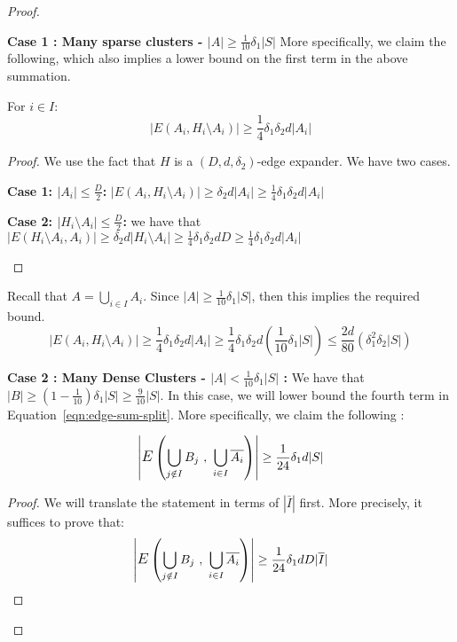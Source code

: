 \begin{proof}
\begin{description}
\item{\bf Case 1 : Many sparse clusters - $|A| \ge \frac{1}{10}\delta_1|S|$}
More specifically, we claim the following, which also implies a lower bound on the first term in the above summation.
\begin{claim} 
For $i \in I$:
$$|E(A_i,H_i\setminus A_i)| \ge \frac{1}{4}\delta_1\delta_2d|A_i|$$
\end{claim}
\begin{proof}
We use the fact that $H$ is a $(D,d,\delta_2)$-edge expander. We have two cases.
\begin{description}
\item{\bf Case 1:  $|A_i| \le \frac{D}{2}$:}
$\left|E(A_i,H_i\setminus A_i)\right| \ge \delta_2d|A_i| \ge \frac{1}{4}\delta_1\delta_2d|A_i|$
\item{\bf Case 2: $|H_i\setminus A_i| \le \frac{D}{2}$:}
we have that $\left|E(H_i\setminus A_i,A_i)\right| \ge \delta_2d|H_i\setminus A_i| \ge \frac{1}{4}\delta_1\delta_2dD \ge \frac{1}{4}\delta_1\delta_2d|A_i|$
\end{description} 
\vspace{-7mm}
\end{proof}
\noindent Recall that $A = \bigcup_{i \in I} A_i$. Since $|A| \ge \frac{1}{10}\delta_1|S|$, then this implies the required bound. $$|E(A_i,H_i\setminus A_i)| \ge \frac{1}{4}\delta_1\delta_2d|A_i| \ge \frac{1}{4}\delta_1 \delta_2 d \left(\frac{1}{10}\delta_1|S|  \right) \le \frac{2d}{80}\left(\delta_1^2\delta_2|S|\right)$$

\item{\bf Case 2 : Many Dense Clusters - $|A| < \frac{1}{10}\delta_1|S|$ :}
We have that  $|B| \ge (1-\frac{1}{10})\delta_1|S| \ge \frac{9}{10}|S|$.
In this case, we will lower bound the fourth term in Equation~\ref{eqn:edge-sum-split}. More specifically, we claim the following :

\begin{claim}
\label{claim:expansion}
$$\left| \mathlarger{E}\left(\bigcup_{j \notin I} B_j~,~\bigcup_{i \in I} \bar{A_i} \right) \right| \ge \frac{1}{24}\delta_1 d |S| $$
\end{claim}

\begin{proof}
We will translate the statement in terms of $|\bar{I}|$ first. More precisely, it suffices to prove that:
\begin{equation}
\left| \mathlarger{E}\left(\bigcup_{j \notin I} B_j~,~\bigcup_{i \in I} \bar{A_i} \right) \right| \ge \frac{1}{24}\delta_1 d D|\bar{I}|
\label{eqn:claim4}
\end{equation}


\end{proof}
\end{description}
\end{proof}

